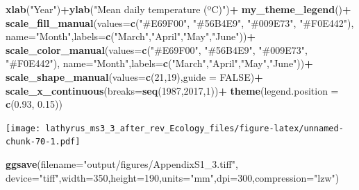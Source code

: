 \documentclass[
]{article}
\newenvironment{Shaded}{\begin{snugshade}}{\end{snugshade}}
\newcommand{\DataTypeTok}[1]{\textcolor[rgb]{0.13,0.29,0.53}{#1}}
\newcommand{\DecValTok}[1]{\textcolor[rgb]{0.00,0.00,0.81}{#1}}
\newcommand{\FloatTok}[1]{\textcolor[rgb]{0.00,0.00,0.81}{#1}}
\newcommand{\KeywordTok}[1]{\textcolor[rgb]{0.13,0.29,0.53}{\textbf{#1}}}
\newcommand{\NormalTok}[1]{#1}
\newcommand{\OperatorTok}[1]{\textcolor[rgb]{0.81,0.36,0.00}{\textbf{#1}}}
\newcommand{\OtherTok}[1]{\textcolor[rgb]{0.56,0.35,0.01}{#1}}
\newcommand{\StringTok}[1]{\textcolor[rgb]{0.31,0.60,0.02}{#1}}
\begin{document}
\begin{Shaded}
\begin{Highlighting}[]
\StringTok{  }\KeywordTok{xlab}\NormalTok{(}\StringTok{"Year"}\NormalTok{)}\OperatorTok{+}\KeywordTok{ylab}\NormalTok{(}\StringTok{"Mean daily temperature (ºC)"}\NormalTok{)}\OperatorTok{+}
\StringTok{  }\KeywordTok{my\_theme\_legend}\NormalTok{()}\OperatorTok{+}
\StringTok{  }\KeywordTok{scale\_fill\_manual}\NormalTok{(}\DataTypeTok{values=}\KeywordTok{c}\NormalTok{(}\StringTok{"\#E69F00"}\NormalTok{, }\StringTok{"\#56B4E9"}\NormalTok{, }\StringTok{"\#009E73"}\NormalTok{, }\StringTok{"\#F0E442"}\NormalTok{),}
                    \DataTypeTok{name=}\StringTok{"Month"}\NormalTok{,}\DataTypeTok{labels=}\KeywordTok{c}\NormalTok{(}\StringTok{"March"}\NormalTok{,}\StringTok{"April"}\NormalTok{,}\StringTok{"May"}\NormalTok{,}\StringTok{"June"}\NormalTok{))}\OperatorTok{+}
\StringTok{  }\KeywordTok{scale\_color\_manual}\NormalTok{(}\DataTypeTok{values=}\KeywordTok{c}\NormalTok{(}\StringTok{"\#E69F00"}\NormalTok{, }\StringTok{"\#56B4E9"}\NormalTok{, }\StringTok{"\#009E73"}\NormalTok{, }\StringTok{"\#F0E442"}\NormalTok{),}
                     \DataTypeTok{name=}\StringTok{"Month"}\NormalTok{,}\DataTypeTok{labels=}\KeywordTok{c}\NormalTok{(}\StringTok{"March"}\NormalTok{,}\StringTok{"April"}\NormalTok{,}\StringTok{"May"}\NormalTok{,}\StringTok{"June"}\NormalTok{))}\OperatorTok{+}
\StringTok{  }\KeywordTok{scale\_shape\_manual}\NormalTok{(}\DataTypeTok{values=}\KeywordTok{c}\NormalTok{(}\DecValTok{21}\NormalTok{,}\DecValTok{19}\NormalTok{),}\DataTypeTok{guide =} \OtherTok{FALSE}\NormalTok{)}\OperatorTok{+}
\StringTok{  }\KeywordTok{scale\_x\_continuous}\NormalTok{(}\DataTypeTok{breaks=}\KeywordTok{seq}\NormalTok{(}\DecValTok{1987}\NormalTok{,}\DecValTok{2017}\NormalTok{,}\DecValTok{1}\NormalTok{))}\OperatorTok{+}
\StringTok{  }\KeywordTok{theme}\NormalTok{(}\DataTypeTok{legend.position =} \KeywordTok{c}\NormalTok{(}\FloatTok{0.93}\NormalTok{, }\FloatTok{0.15}\NormalTok{))}
\end{Highlighting}
\end{Shaded}

\texttt{[image: lathyrus\_ms3\_3\_after\_rev\_Ecology\_files/figure-latex/unnamed-chunk-70-1.pdf]}

\begin{Shaded}
\begin{Highlighting}[]
\KeywordTok{ggsave}\NormalTok{(}\DataTypeTok{filename=}\StringTok{"output/figures/AppendixS1\_3.tiff"}\NormalTok{,}
       \DataTypeTok{device=}\StringTok{"tiff"}\NormalTok{,}\DataTypeTok{width=}\DecValTok{350}\NormalTok{,}\DataTypeTok{height=}\DecValTok{190}\NormalTok{,}\DataTypeTok{units=}\StringTok{"mm"}\NormalTok{,}\DataTypeTok{dpi=}\DecValTok{300}\NormalTok{,}\DataTypeTok{compression=}\StringTok{"lzw"}\NormalTok{)}
\end{Highlighting}
\end{Shaded}
\end{document}
